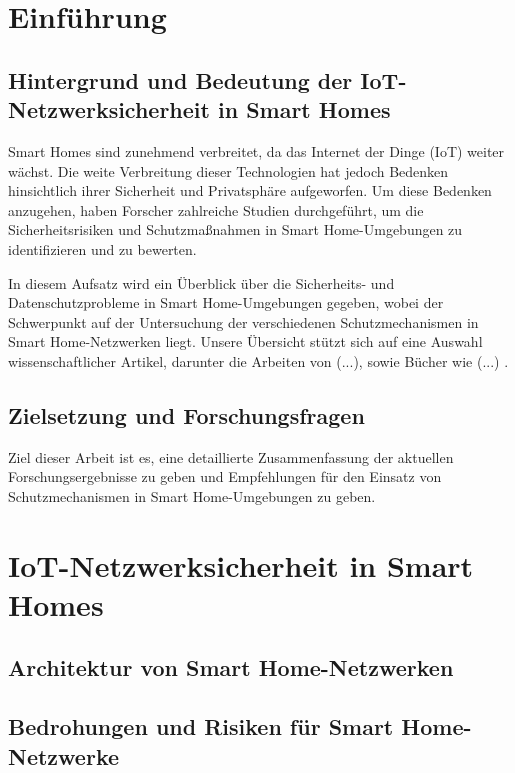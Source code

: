 
\usepackage{enumitem}
\usepackage{cite}
    
\usepackage{natbib}
\newcommand{\dozent}{Dr. Larissa Groth}
\newcommand{\veranstaltung}{IoT Network Security}
\newcommand{\semester}{SoSe23}
\newcommand{\studenten}{Aiman Al-Hazmi, Zohreh Asadi}



\tableofcontents
\newpage

\section{Einführung}
\subsection{Hintergrund und Bedeutung der IoT-Netzwerksicherheit in Smart Homes
}
Smart Homes sind zunehmend verbreitet, da das Internet der Dinge (IoT) weiter wächst. Die weite Verbreitung dieser Technologien hat jedoch Bedenken hinsichtlich ihrer Sicherheit und Privatsphäre aufgeworfen. Um diese Bedenken anzugehen, haben Forscher zahlreiche Studien durchgeführt, um die Sicherheitsrisiken und Schutzmaßnahmen in Smart Home-Umgebungen zu identifizieren und zu bewerten.

In diesem Aufsatz wird ein Überblick über die Sicherheits- und Datenschutzprobleme in Smart Home-Umgebungen gegeben, wobei der Schwerpunkt auf der Untersuchung der verschiedenen Schutzmechanismen in Smart Home-Netzwerken liegt. Unsere Übersicht stützt sich auf eine Auswahl wissenschaftlicher Artikel, darunter die Arbeiten von (...), sowie Bücher wie (...) . 
\subsection{Zielsetzung und Forschungsfragen}
Ziel dieser Arbeit ist es, eine detaillierte Zusammenfassung der aktuellen Forschungsergebnisse zu geben und Empfehlungen für den Einsatz von Schutzmechanismen in Smart Home-Umgebungen zu geben.

\newpage
\section{IoT-Netzwerksicherheit in Smart Homes}

\subsection{Architektur von Smart Home-Netzwerken}
\subsection{Bedrohungen und Risiken für Smart Home-Netzwerke}
